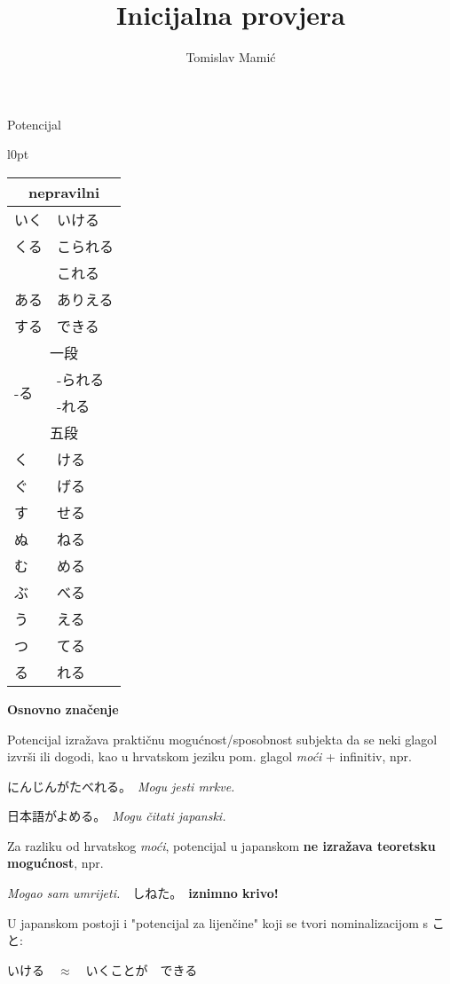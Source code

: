 \documentclass[12pt]{article}
\author{Tomislav Mamić}
\title{Inicijalna provjera}
\begin{document}
	\large Potencijal
		
	\begin{wraptable}[24]{l}{0pt}
	\begin{tabular}{|l|l|}
		\hline
		\multicolumn{2}{|c|}{nepravilni}\\
		\hline
		いく&いける\\
		くる&こられる\\
		&これる\footnotemark[1]\\
		ある&ありえる\footnotemark[2]\\
		する&できる\\
		\hline
		\hline
		\multicolumn{2}{|c|}{一段}\\
		\hline
		\multirow{2}{30pt}{-る}&-られる\\
		&-れる\footnotemark[1]\\
		\hline
		\hline
		\multicolumn{2}{|c|}{五段\footnotemark[3]}\\
		\hline
		く&ける\\
		ぐ&げる\\
		す&せる\\
		\hline
		ぬ&ねる\\
		む&める\\
		ぶ&べる\\
		\hline
		う&える\\
		つ&てる\\
		る&れる\\
		\hline
	\end{tabular}
	\end{wraptable}

	\vspace{20pt}
	\normalsize \textbf{Osnovno značenje}
	\vspace{20pt}
	
	Potencijal izražava praktičnu mogućnost/sposobnost subjekta da se neki glagol izvrši ili dogodi, kao u hrvatskom jeziku pom. glagol \textit{moći} + infinitiv, npr.
	
	にんじんがたべれる。　\textit{Mogu jesti mrkve.}
	
	日本語がよめる。　\textit{Mogu čitati japanski.}
	
	Za razliku od hrvatskog \textit{moći}, potencijal u japanskom \textbf{ne izražava teoretsku mogućnost}, npr.
	
	\textit{Mogao sam umrijeti.}　しねた。　\textbf{iznimno krivo!}
	
	U japanskom postoji i "potencijal za lijenčine" koji se tvori nominalizacijom s こと:
	
	いける　$\approx$　いくことが　できる 
	
\end{document}

